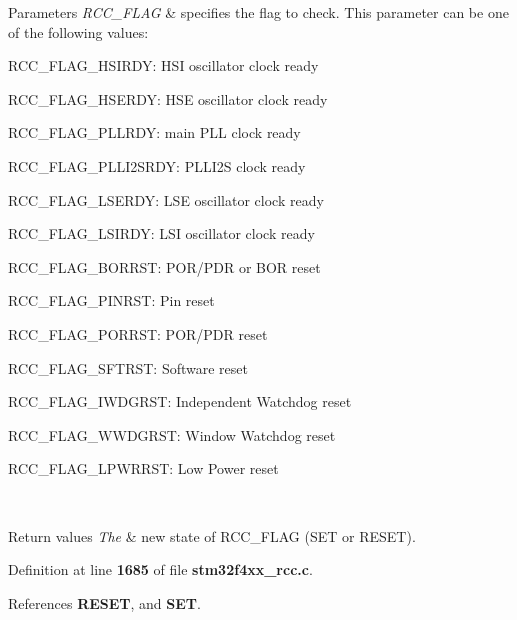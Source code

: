 \begin{DoxyParams}{Parameters}
{\em R\+C\+C\+\_\+\+F\+L\+AG} & specifies the flag to check. This parameter can be one of the following values\+: \begin{DoxyItemize}
\item R\+C\+C\+\_\+\+F\+L\+A\+G\+\_\+\+H\+S\+I\+R\+DY\+: H\+SI oscillator clock ready \item R\+C\+C\+\_\+\+F\+L\+A\+G\+\_\+\+H\+S\+E\+R\+DY\+: H\+SE oscillator clock ready \item R\+C\+C\+\_\+\+F\+L\+A\+G\+\_\+\+P\+L\+L\+R\+DY\+: main P\+LL clock ready \item R\+C\+C\+\_\+\+F\+L\+A\+G\+\_\+\+P\+L\+L\+I2\+S\+R\+DY\+: P\+L\+L\+I2S clock ready \item R\+C\+C\+\_\+\+F\+L\+A\+G\+\_\+\+L\+S\+E\+R\+DY\+: L\+SE oscillator clock ready \item R\+C\+C\+\_\+\+F\+L\+A\+G\+\_\+\+L\+S\+I\+R\+DY\+: L\+SI oscillator clock ready \item R\+C\+C\+\_\+\+F\+L\+A\+G\+\_\+\+B\+O\+R\+R\+ST\+: P\+O\+R/\+P\+DR or B\+OR reset \item R\+C\+C\+\_\+\+F\+L\+A\+G\+\_\+\+P\+I\+N\+R\+ST\+: Pin reset \item R\+C\+C\+\_\+\+F\+L\+A\+G\+\_\+\+P\+O\+R\+R\+ST\+: P\+O\+R/\+P\+DR reset \item R\+C\+C\+\_\+\+F\+L\+A\+G\+\_\+\+S\+F\+T\+R\+ST\+: Software reset \item R\+C\+C\+\_\+\+F\+L\+A\+G\+\_\+\+I\+W\+D\+G\+R\+ST\+: Independent Watchdog reset \item R\+C\+C\+\_\+\+F\+L\+A\+G\+\_\+\+W\+W\+D\+G\+R\+ST\+: Window Watchdog reset \item R\+C\+C\+\_\+\+F\+L\+A\+G\+\_\+\+L\+P\+W\+R\+R\+ST\+: Low Power reset \end{DoxyItemize}
\\
\hline
\end{DoxyParams}

\begin{DoxyRetVals}{Return values}
{\em The} & new state of R\+C\+C\+\_\+\+F\+L\+AG (S\+ET or R\+E\+S\+ET). \\
\hline
\end{DoxyRetVals}


Definition at line \textbf{ 1685} of file \textbf{ stm32f4xx\+\_\+rcc.\+c}.



References \textbf{ R\+E\+S\+ET}, and \textbf{ S\+ET}.



